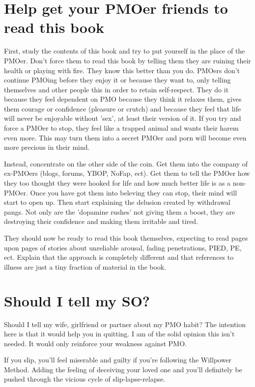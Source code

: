 \documentclass[easypeasy.tex]{subfiles}
\begin{document}
\section{Help get your PMOer friends to read this book}

First, study the contents of this book and try to put yourself in the place of the PMOer. Don't force them to read this book by telling them they are ruining their health or playing with fire. They know this better than you do. PMOers don't continue PMOing before they enjoy it or because they want to, only telling themselves and other people this in order to retain self-respect. They do it because they feel dependent on PMO because they think it relaxes them, gives them courage or confidence (pleasure or crutch) and because they feel that life will never be enjoyable without 'sex', at least their version of it. If you try and force a PMOer to stop, they feel like a trapped animal and wants their harem even more. This may turn them into a secret PMOer and porn will become even more precious in their mind.

Instead, concentrate on the other side of the coin. Get them into the company of ex-PMOers (blogs, forums, YBOP, NoFap, ect). Get them to tell the PMOer how they too thought they were hooked for life and how much better life is as a non-PMOer. Once you have got them into beleving they can stop, their mind will start to open up. Then start explaining the delusion created by withdrawal pangs. Not only are the 'dopamine rushes' not giving them a boost, they are destroying their confidence and making them irritable and tired.

They should now be ready to read this book themselves, expecting to read pages upon pages of stories about unreliable arousal, fading penetrations, PIED, PE, ect. Explain that the approach is completely different and that references to illness are just a tiny fraction of material in the book.

\section{Should I tell my SO?}

Should I tell my wife, girlfriend or partner about my PMO habit? The intention here is that it would help you in quitting. I am of the solid opinion this isn't needed. It would only reinforce your weakness against PMO.

If you slip, you'll feel miserable and guilty if you're following the Willpower Method. Adding the feeling of deceiving your loved one and you'll definitely be pushed through the vicious cycle of slip-lapse-relapse.
\end{document}

